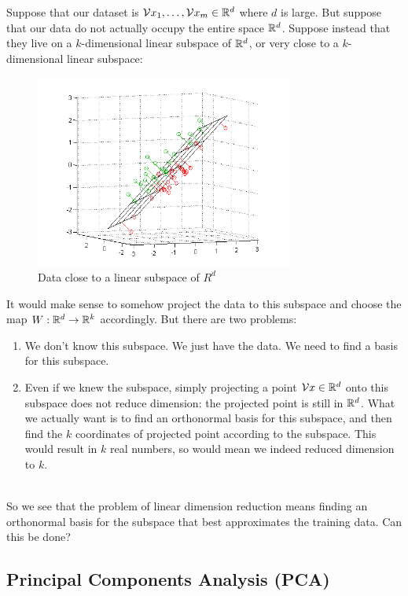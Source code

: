 Suppose that our dataset is 
$\mathcal{V}{x}_1,\ldots,\mathcal{V}{x}_m\in\mathbb{R}^d$ where $d$ is large. But suppose that our
data do not actually occupy the entire
space $\mathbb{R}^d$. Suppose instead that they live on a $k$-dimensional linear 
subspace of $\mathbb{R}^d$, or very close to a  $k$-dimensional linear 
subspace:

\begin{figure}[H]
  \centering
  \includegraphics[height=2.5in]{subspace.png}    
  \caption{Data close to a linear subspace of $R^d$}
\end{figure}

It would make sense to somehow project the data to this subspace and choose the
map $W:\mathbb{R}^d\to\mathbb{R}^k$ accordingly. 
But there are two
problems: 
\begin{enumerate}
  \item We don't know this subspace. We just have the data. We need to find a
    basis for this subspace.
  \item Even if we knew the subspace, 
    simply projecting a point $\mathcal{V}{x}\in\mathbb{R}^d$ onto this subspace does not 
    reduce dimension: the projected point is still in $\mathbb{R}^d$. What we actually
    want is to find an orthonormal basis for this subspace, and then find
    the $k$ coordinates of 
    projected point according to the subspace. This would result in $k$ 
    real numbers, so would mean we indeed reduced dimension to $k$. 
 
\end{enumerate}
~\\
So we see that the problem of linear dimension reduction means finding an
orthonormal basis for the subspace that best approximates the training data. Can
this be done?

\subsection{Principal Components Analysis (PCA)}

